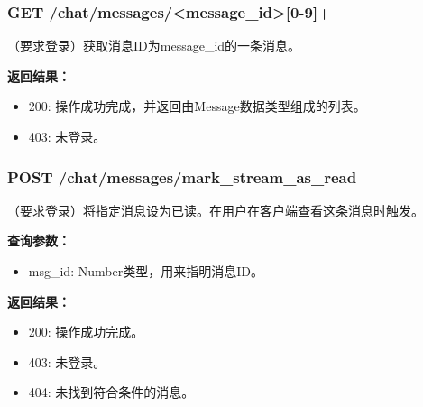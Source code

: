 \subsubsection{\textbf{GET} /chat/messages/<message\_id>[0-9]+}
（要求登录）获取消息ID为message\_id的一条消息。

\textbf{返回结果：}
    \begin{itemize}
    \item 200: 操作成功完成，并返回由Message数据类型组成的列表。
    \item 403: 未登录。
    \end{itemize}

\subsubsection{\textbf{POST} /chat/messages/mark\_stream\_as\_read}
（要求登录）将指定消息设为已读。在用户在客户端查看这条消息时触发。

\textbf{查询参数：}
    \begin{itemize}
        \item msg\_id: Number类型，用来指明消息ID。
    \end{itemize}

\textbf{返回结果：}
    \begin{itemize}
    \item 200: 操作成功完成。
    \item 403: 未登录。
    \item 404: 未找到符合条件的消息。
    \end{itemize}

